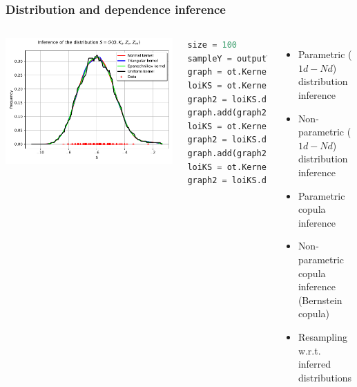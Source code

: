 \documentclass[aspectratio=169]{beamer}
\begin{document}

\begin{frame}[containsverbatim]
\frametitle{Distribution and dependence inference}

\scriptsize{

\begin{columns}

    \includegraphics[width=.8\textwidth]{figures/Inference.pdf}


  
    

\scriptsize 
\begin{lstlisting}[language=Python, numbers = none]
size = 100
sampleY = outputVector.getSample(size)
graph = ot.KernelSmoothing(ot.Normal()).build(sampleY).drawPDF()
loiKS = ot.KernelSmoothing(ot.Triangular()).build(sampleY)
graph2 = loiKS.drawPDF()
graph.add(graph2)
loiKS = ot.KernelSmoothing(ot.Epanechnikov()).build(sampleY)
graph2 = loiKS.drawPDF()
graph.add(graph2)
loiKS = ot.KernelSmoothing(ot.Uniform()).build(sampleY)
graph2 = loiKS.drawPDF()

\end{lstlisting}

	  \begin{itemize}
  \item Parametric ($1d - Nd$) distribution inference
  \item Non-parametric ($1d - Nd$) distribution inference
  \item Parametric copula inference
  \item Non-parametric copula inference (Bernstein copula)
  \item Resampling w.r.t. inferred distributions
  \end{itemize}
  
\end{columns}


}


\end{frame}
\end{document}

